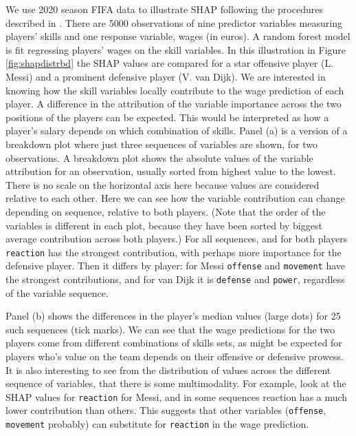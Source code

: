 \documentclass[
]{jss}
\begin{document}
We use 2020 season FIFA data \citep{leone_fifa_2020} to illustrate SHAP
following the procedures described in \citet{biecek_explanatory_2021}.
There are 5000 observations of nine predictor variables measuring
players' skills and one response variable, wages (in euros). A random
forest model is fit regressing players' wages on the skill variables. In
this illustration in Figure \ref{fig:shapdistrbd} the SHAP values are
compared for a star offensive player (L. Messi) and a prominent
defensive player (V. van Dijk). We are interested in knowing how the
skill variables locally contribute to the wage prediction of each
player. A difference in the attribution of the variable importance
across the two positions of the players can be expected. This would be
interpreted as how a player's salary depends on which combination of
skills. Panel (a) is a version of a breakdown plot
\citep{gosiewska_ibreakdown_2019} where just three sequences of
variables are shown, for two observations. A breakdown plot shows the
absolute values of the variable attribution for an observation, usually
sorted from highest value to the lowest. There is no scale on the
horizontal axis here because values are considered relative to each
other. Here we can see how the variable contribution can change
depending on sequence, relative to both players. (Note that the order of
the variables is different in each plot, because they have been sorted
by biggest average contribution across both players.) For all sequences,
and for both players \texttt{reaction} has the strongest contribution,
with perhaps more importance for the defensive player. Then it differs
by player: for Messi \texttt{offense} and \texttt{movement} have the
strongest contributions, and for van Dijk it is \texttt{defense} and
\texttt{power}, regardless of the variable sequence.

Panel (b) shows the differences in the player's median values (large
dots) for 25 such sequences (tick marks). We can see that the wage
predictions for the two players come from different combinations of
skills sets, as might be expected for players who's value on the team
depends on their offensive or defensive prowess. It is also interesting
to see from the distribution of values across the different sequence of
variables, that there is some multimodality. For example, look at the
SHAP values for \texttt{reaction} for Messi, and in some sequences
reaction has a much lower contribution than others. This suggests that
other variables (\texttt{offense}, \texttt{movement} probably) can
substitute for \texttt{reaction} in the wage prediction.
\end{document}
